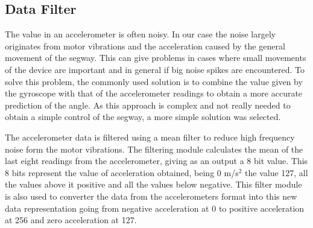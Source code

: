 \subsection{Data Filter}

The value in an accelerometer is often noisy.
In our case the noise largely originates from motor vibrations and the acceleration caused by the general movement of the segway.
This can give problems in cases where small movements of the device are important and in general if big noise spikes are encountered.
To solve this problem, the commonly used solution is to combine the value given by the gyroscope with that of the accelerometer readings to obtain a more accurate prediction of the angle.
As this approach is complex and not really needed to obtain a simple control of the segway, a more simple solution was selected.

The accelerometer data is filtered using a mean filter to reduce high frequency noise form the motor vibrations.
The filtering module calculates the mean of the last eight readings from the accelerometer, giving as an output a 8 bit value.
This 8 bits represent the value of acceleration obtained, being 0 m/s$^{2}$ the value 127, all the values above it positive and all the values below negative.
This filter module is also used to converter the data from the accelerometers format into this new data representation going from negative acceleration at 0 to positive acceleration at 256 and zero acceleration at 127.